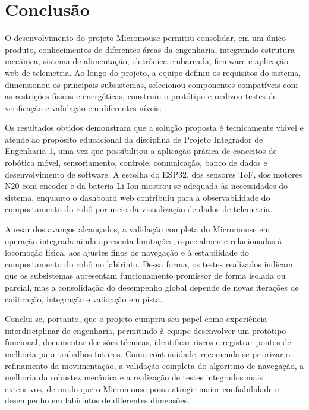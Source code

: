 \chapter{Conclusão}
\label{conclusao}

O desenvolvimento do projeto Micromouse permitiu consolidar, em um único produto, conhecimentos de diferentes áreas da engenharia, integrando estrutura mecânica, sistema de alimentação, eletrônica embarcada, firmware e aplicação web de telemetria. Ao longo do projeto, a equipe definiu os requisitos do sistema, dimensionou os principais subsistemas, selecionou componentes compatíveis com as restrições físicas e energéticas, construiu o protótipo e realizou testes de verificação e validação em diferentes níveis.

Os resultados obtidos demonstram que a solução proposta é tecnicamente viável e atende ao propósito educacional da disciplina de Projeto Integrador de Engenharia 1, uma vez que possibilitou a aplicação prática de conceitos de robótica móvel, sensoriamento, controle, comunicação, banco de dados e desenvolvimento de software. A escolha do ESP32, dos sensores ToF, dos motores N20 com encoder e da bateria Li-Ion mostrou-se adequada às necessidades do sistema, enquanto o dashboard web contribuiu para a observabilidade do comportamento do robô por meio da visualização de dados de telemetria.

Apesar dos avanços alcançados, a validação completa do Micromouse em operação integrada ainda apresenta limitações, especialmente relacionadas à locomoção física, aos ajustes finos de navegação e à estabilidade do comportamento do robô no labirinto. Dessa forma, os testes realizados indicam que os subsistemas apresentam funcionamento promissor de forma isolada ou parcial, mas a consolidação do desempenho global depende de novas iterações de calibração, integração e validação em pista.

Conclui-se, portanto, que o projeto cumpriu seu papel como experiência interdisciplinar de engenharia, permitindo à equipe desenvolver um protótipo funcional, documentar decisões técnicas, identificar riscos e registrar pontos de melhoria para trabalhos futuros. Como continuidade, recomenda-se priorizar o refinamento da movimentação, a validação completa do algoritmo de navegação, a melhoria da robustez mecânica e a realização de testes integrados mais extensivos, de modo que o Micromouse possa atingir maior confiabilidade e desempenho em labirintos de diferentes dimensões.